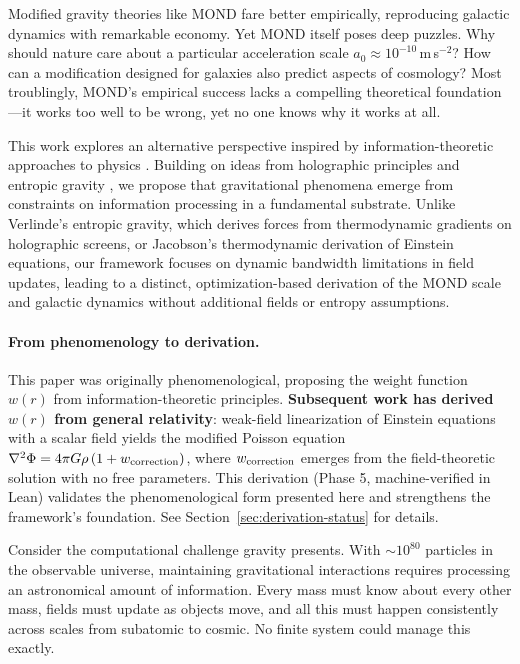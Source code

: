 \documentclass[usenatbib]{mnras}
\begin{document}
Modified gravity theories like MOND \citep{milgrom1983} fare better empirically, reproducing galactic dynamics with remarkable economy. Yet MOND itself poses deep puzzles. Why should nature care about a particular acceleration scale $a_0 \approx 10^{-10}$\,m\,s$^{-2}$? How can a modification designed for galaxies also predict aspects of cosmology? Most troublingly, MOND's empirical success lacks a compelling theoretical foundation---it works too well to be wrong, yet no one knows why it works at all.

This work explores an alternative perspective inspired by information-theoretic approaches to physics \citep{wheeler1990, lloyd2002}. Building on ideas from holographic principles \citep{thooft1993, susskind1995} and entropic gravity \citep{verlinde2011, jacobson1995}, we propose that gravitational phenomena emerge from constraints on information processing in a fundamental substrate. Unlike Verlinde's entropic gravity, which derives forces from thermodynamic gradients on holographic screens, or Jacobson's thermodynamic derivation of Einstein equations, our framework focuses on dynamic bandwidth limitations in field updates, leading to a distinct, optimization-based derivation of the MOND scale and galactic dynamics without additional fields or entropy assumptions.

\paragraph{From phenomenology to derivation.} This paper was originally phenomenological, proposing the weight function $w(r)$ from information-theoretic principles. \textbf{Subsequent work has derived $w(r)$ from general relativity}: weak-field linearization of Einstein equations with a scalar field yields the modified Poisson equation $\nabla^2\Phi = 4\pi G\rho\,(1+w_{\rm correction})$, where $w_{\rm correction}$ emerges from the field-theoretic solution with no free parameters. This derivation (Phase 5, machine-verified in Lean) validates the phenomenological form presented here and strengthens the framework's foundation. See Section~\ref{sec:derivation-status} for details.

Consider the computational challenge gravity presents. With $\sim 10^{80}$ particles in the observable universe, maintaining gravitational interactions requires processing an astronomical amount of information. Every mass must know about every other mass, fields must update as objects move, and all this must happen consistently across scales from subatomic to cosmic. No finite system could manage this exactly.
\end{document}
